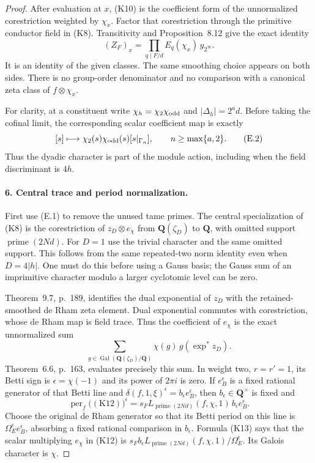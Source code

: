 \begin{proof}
After evaluation at $x$, (K10) is the coefficient form of the
unnormalized corestriction weighted by $\chi_x$. Factor that
corestriction through the primitive conductor field in (K8).
Transitivity and Proposition~8.12 give the exact identity
\[
              (Z_F)_x=
       \prod_{q\mid F/d}E_q(\chi_x)\,y_{2^\infty}.        \tag{E.1}
\]
It is an identity of the given classes. The same smoothing choice
appears on both sides. There is no group-order denominator and no
comparison with a canonical zeta class of $f\otimes\chi_x$.

For clarity, at a constituent write $\chi_h=\chi_2\chi_{\rm odd}$ and
$|\Delta_h|=2^a d$. Before taking the cofinal limit, the corresponding
scalar coefficient map is exactly
\[
 [s]\longmapsto\chi_2(s)\chi_{\rm odd}(s)[s|_{\Gamma_n}],
                    \qquad n\ge\max\{a,2\}.\tag{E.2}
\]
Thus the dyadic character is part of the module action, including
when the field discriminant is $4h$.

\paragraph{6. Central trace and period normalization.}
First use (E.1) to remove the unused tame primes. The central
specialization of (K8) is the corestriction of $z_D\otimes e_\chi$
from $\mathbf Q(\zeta_D)$ to $\mathbf Q$, with omitted support
$\operatorname{prime}(2Nd)$. For $D=1$ use the trivial character
and the same omitted support. This follows from the same repeated-two
norm identity even when $D=4|h|$. One must do this before using a
Gauss basis; the Gauss sum of an imprimitive character modulo a
larger cyclotomic level can be zero.

Theorem~9.7, p.~189, identifies the dual exponential of $z_D$ with
the retained-smoothed de Rham zeta element. Dual exponential commutes
with corestriction, whose de Rham map is field trace. Thus the
coefficient of $e_\chi$ is the exact unnormalized sum
\[
                    \sum_{g\in\operatorname{Gal}(\mathbf Q(\zeta_D)/\mathbf Q)}
                       \chi(g)\,g(\exp^*z_D).             \tag{K12}
\]
Theorem~6.6, p.~163, evaluates precisely this sum. In weight two,
$r=r'=1$, its Betti sign is $\epsilon=\chi(-1)$ and its power of
$2\pi i$ is zero. If $e_B^\epsilon$ is a fixed rational generator
of that Betti line and
$\delta(f,1,\xi)^\epsilon=b_\epsilon e_B^\epsilon$, then
$b_\epsilon\in\mathbf Q^\times$ is fixed and
\[
     \operatorname{per}_f\bigl((\text{K12})\bigr)^\epsilon
          =s_F L_{\operatorname{prime}(2Nd)}(f,\chi,1)\,
                        b_\epsilon e_B^\epsilon.          \tag{K13}
\]
Choose the original de Rham generator so that its Betti period
on this line is $\Omega_E^\epsilon e_B^\epsilon$, absorbing a
fixed rational comparison in $b_\epsilon$. Formula (K13) says
that the scalar multiplying $e_\chi$ in (K12) is
$s_F b_\epsilon L_{\operatorname{prime}(2Nd)}(f,\chi,1)/
\Omega_E^\epsilon$. Its Galois character is $\chi$.


\end{proof}

